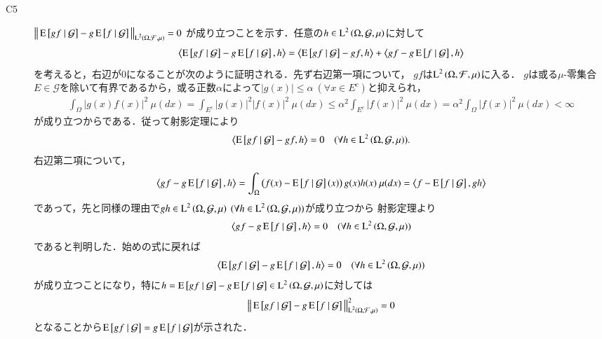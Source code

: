 \begin{prf}
\begin{description}
			\item[C5] $\left\|\, \operatorname{E} \left[ gf \ \middle|\ \mathcal{G} \right] - g\operatorname{E} \left[ f \ \middle|\ \mathcal{G} \right]\, \right\|_{\operatorname{L}^{2} \left(\Omega, \mathcal{F},\mu\right)} = 0$
				が成り立つことを示す．任意の$h \in \operatorname{L}^{2} \left(\Omega, \mathcal{G},\mu\right)$に対して
				\begin{align}
					\inprod<\cexp{gf}{\mathcal{G}} - g\cexp{f}{\mathcal{G}}, h> 
					= \inprod<\cexp{gf}{\mathcal{G}} - gf, h> + \inprod<gf - g\cexp{f}{\mathcal{G}}, h>
				\end{align}
				を考えると，右辺が0になることが次のように証明される．先ず右辺第一項について，
				$gf$は$\operatorname{L}^{2} \left(\Omega, \mathcal{F},\mu\right)$に入る．
				$g$は或る$\mu$-零集合$E \in \mathcal{G}$を除いて有界であるから，或る正数$\alpha$によって$|g(x)| \leq \alpha \ (\forall x \in E^c)$と抑えられ，
				\begin{align}
					\int_{\Omega} |g(x)f(x)|^2\ \mu(dx) = \int_{E^c} |g(x)|^2|f(x)|^2\ \mu(dx) \leq \alpha^2 \int_{E^c} |f(x)|^2\ \mu(dx) = \alpha^2 \int_{\Omega} |f(x)|^2\ \mu(dx) < \infty
				\end{align}
				が成り立つからである．従って射影定理により
				\begin{align}
					\inprod<\cexp{gf}{\mathcal{G}} - gf, h> = 0 \quad (\forall h \in \Lp{2}{\Omega, \mathcal{G},\mu}).
				\end{align}
				右辺第二項について，
				\begin{align}
					\inprod<gf - g\cexp{f}{\mathcal{G}}, h> = \int_{\Omega} \left( f(x) - \cexp{f}{\mathcal{G}}(x) \right) g(x)h(x)\ \mu(dx)
					= \inprod<f - \cexp{f}{\mathcal{G}}, gh>
				\end{align}
				であって，先と同様の理由で$gh \in \operatorname{L}^{2} \left(\Omega, \mathcal{G},\mu\right) \ (\forall h \in \operatorname{L}^{2} \left(\Omega, \mathcal{G},\mu\right))$が成り立つから
				射影定理より
				\begin{align}
					\inprod<gf - g\cexp{f}{\mathcal{G}}, h> = 0  \quad (\forall h \in \Lp{2}{\Omega, \mathcal{G},\mu})
				\end{align}
				であると判明した．始めの式に戻れば
				\begin{align}
					\inprod<\cexp{gf}{\mathcal{G}} - g\cexp{f}{\mathcal{G}}, h> = 0  \quad (\forall h \in \Lp{2}{\Omega, \mathcal{G},\mu})
				\end{align}
				が成り立つことになり，特に$h = \operatorname{E} \left[ gf \ \middle|\ \mathcal{G} \right] - g\operatorname{E} \left[ f \ \middle|\ \mathcal{G} \right] \in \operatorname{L}^{2} \left(\Omega, \mathcal{G},\mu\right)$に対しては
				\begin{align}
					\left\|\, \operatorname{E} \left[ gf \ \middle|\ \mathcal{G} \right] - g\operatorname{E} \left[ f \ \middle|\ \mathcal{G} \right]\, \right\|_{\operatorname{L}^{2} \left(\Omega, \mathcal{F},\mu\right)}^2 = 0
				\end{align}
				となることから$\operatorname{E} \left[ gf \ \middle|\ \mathcal{G} \right] = g\operatorname{E} \left[ f \ \middle|\ \mathcal{G} \right]$が示された．
			

\end{description}
\end{prf}
